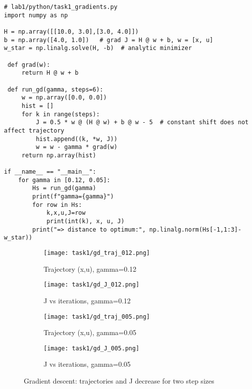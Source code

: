 \begin{lstlisting}[caption={Gradient descent: two step sizes and first iterations},label={lst:gd}]
# lab1/python/task1_gradients.py
import numpy as np

H = np.array([[10.0, 3.0],[3.0, 4.0]])
b = np.array([4.0, 1.0])   # grad J = H @ w + b, w = [x, u]
w_star = np.linalg.solve(H, -b)  # analytic minimizer

 def grad(w):
     return H @ w + b

 def run_gd(gamma, steps=6):
     w = np.array([0.0, 0.0])
     hist = []
     for k in range(steps):
         J = 0.5 * w @ (H @ w) + b @ w - 5  # constant shift does not affect trajectory
         hist.append((k, *w, J))
         w = w - gamma * grad(w)
     return np.array(hist)

if __name__ == "__main__":
    for gamma in [0.12, 0.05]:
        Hs = run_gd(gamma)
        print(f"gamma={gamma}")
        for row in Hs:
            k,x,u,J=row
            print(int(k), x, u, J)
        print("=> distance to optimum:", np.linalg.norm(Hs[-1,1:3]-w_star))
\end{lstlisting}

\begin{figure}[H]
    \centering
    \begin{subfigure}{0.48\textwidth}
        \texttt{[image: task1/gd\_traj\_012.png]}
        \caption{Trajectory (x,u), gamma=0.12}
    \end{subfigure}\hfill
    \begin{subfigure}{0.48\textwidth}
        \texttt{[image: task1/gd\_J\_012.png]}
        \caption{J vs iterations, gamma=0.12}
    \end{subfigure}

    \vspace{0.5em}

    \begin{subfigure}{0.48\textwidth}
        \texttt{[image: task1/gd\_traj\_005.png]}
        \caption{Trajectory (x,u), gamma=0.05}
    \end{subfigure}\hfill
    \begin{subfigure}{0.48\textwidth}
        \texttt{[image: task1/gd\_J\_005.png]}
        \caption{J vs iterations, gamma=0.05}
    \end{subfigure}
    \caption{Gradient descent: trajectories and J decrease for two step sizes}
    \label{fig:gd}
\end{figure}
